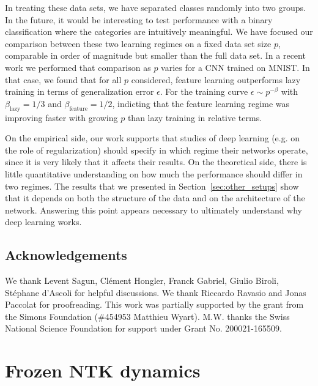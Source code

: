 \documentclass{article}
\renewcommand{\cite}[1]{\citep{#1}}
\newcommand{\sref}[1]{Section~\ref{#1}}
\begin{document}
In treating these data sets, we have separated classes randomly into two groups. In the future, it would be interesting to test performance with a binary classification where the categories are intuitively meaningful.
We have focused our comparison between these two learning regimes on a fixed data set size $p$, comparable in order of magnitude but smaller than the full data set. 
In a recent work\cite{paccolat2020geometric} we performed that comparison as $p$ varies for a CNN trained on MNIST. In that case, we found that for all $p$ considered, feature learning outperforms lazy training in terms of generalization error $\epsilon$. For the training curve $\epsilon \sim p^{-\beta}$  with $\beta_\text{lazy}=1/3$ and  $\beta_\text{feature} = 1/2$, indicting that the feature learning regime was improving faster with growing $p$ than lazy training in relative terms.

On the empirical side, our work supports that studies of deep learning (e.g. on the role of regularization) should specify in which regime their networks operate, since it is very likely that it affects their results. On the theoretical side, there is little quantitative understanding on how much the performance should differ in two regimes. The results that we presented in \sref{sec:other_setups} show that it depends on both the structure of the data and on the architecture of the network. Answering this point appears necessary to ultimately understand why deep learning works.

\subsection*{Acknowledgements}
We thank Levent Sagun, Cl\'ement Hongler, Franck Gabriel, Giulio Biroli, St\'ephane d'Ascoli for helpful discussions.
We thank Riccardo Ravasio and Jonas Paccolat for proofreading.
This work was partially supported by the grant from the Simons Foundation (\#454953 Matthieu Wyart). 
M.W. thanks the Swiss National Science Foundation for support under Grant No. 200021-165509.




\newpage
\appendix

\section{Frozen NTK dynamics} \label{app:frozen_ntk}
\end{document}
